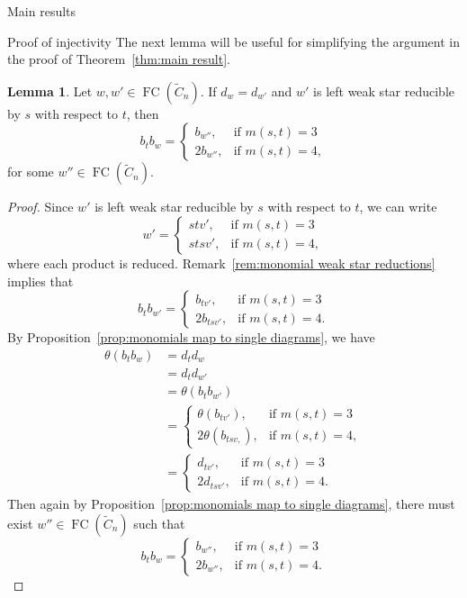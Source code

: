\documentclass[11pt]{amsart}
\theoremstyle{definition}
\newtheorem{lemma}[theorem]{Lemma}
\numberwithin{equation}{section}
\newcommand{\C}{\widetilde{C}}
\renewcommand{\(}{\left(}
\renewcommand{\)}{\right)}
\DeclareMathOperator{\FC}{FC}
\begin{document}
\begin{section}{Main results}
\begin{subsection}{Proof of injectivity}
The next lemma will be useful for simplifying the argument in the proof of Theorem~\ref{thm:main result}.

\begin{lemma}\label{lem:nugget}
Let $w, w' \in \FC(\C_{n})$. If $d_{w}=d_{w'}$ and $w'$ is left weak star reducible by $s$ with respect to $t$, then
\[
b_{t}b_{w}=\begin{cases}
b_{w''}, & \text{if } m(s,t)=3\\
2b_{w''}, & \text{if } m(s,t)=4,
\end{cases}
\]
for some $w'' \in \FC(\C_{n})$.
\end{lemma}

\begin{proof}
Since $w'$ is left weak star reducible by $s$ with respect to $t$, we can write
\[
w'=\begin{cases}
stv', & \text{if } m(s,t)=3\\
stsv', & \text{if } m(s,t)=4,
\end{cases}
\]
where each product is reduced.  Remark~\ref{rem:monomial weak star reductions} implies that
\[
b_{t}b_{w'}=\begin{cases}
b_{tv'}, & \text{if } m(s,t)=3\\
2b_{tsv'}, & \text{if } m(s,t)=4.
\end{cases}
\]
By Proposition~\ref{prop:monomials map to single diagrams}, we have
{\allowdisplaybreaks
\begin{align*}
\theta(b_{t}b_{w})&=d_{t}d_{w}\\
&=d_{t}d_{w'}\\
&=\theta(b_{t}b_{w'})\\
&=\begin{cases}
\theta(b_{tv'}), & \text{if } m(s,t)=3\\
2\theta(b_{tsv,}), & \text{if } m(s,t)=4,
\end{cases}\\
&=\begin{cases}
d_{tv'}, & \text{if } m(s,t)=3\\
2d_{tsv'}, & \text{if } m(s,t)=4.
\end{cases}
\end{align*}}%
Then again by Proposition~\ref{prop:monomials map to single diagrams}, there must exist $w'' \in \FC(\C_{n})$ such that 
\[
b_{t}b_{w}=\begin{cases}
b_{w''}, & \text{if } m(s,t)=3\\
2b_{w''}, & \text{if } m(s,t)=4.
\end{cases}
\]
\end{proof}


\end{subsection}
\end{section}
\end{document}

